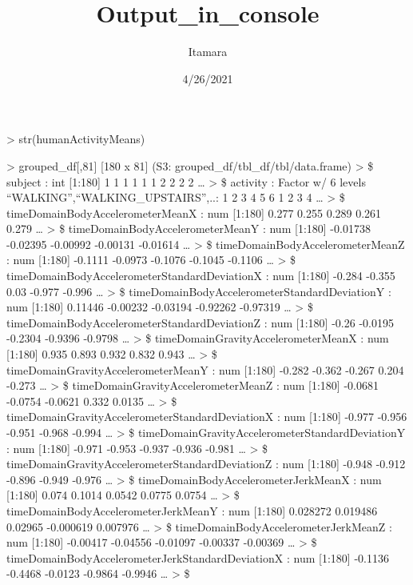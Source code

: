 \documentclass[
]{article}
\title{Output\_in\_console}
\author{Itamara}
\date{4/26/2021}
\begin{document}
\maketitle

{
\setcounter{tocdepth}{2}
\tableofcontents
}
\textgreater{} str(humanActivityMeans)

\textgreater{} grouped\_df{[},81{]} {[}180 x 81{]} (S3:
grouped\_df/tbl\_df/tbl/data.frame) \textgreater{} \$ subject : int
{[}1:180{]} 1 1 1 1 1 1 2 2 2 2 \ldots{} \textgreater{} \$ activity :
Factor w/ 6 levels ``WALKING'',``WALKING\_UPSTAIRS'',..: 1 2 3 4 5 6 1 2
3 4 \ldots{} \textgreater{} \$ timeDomainBodyAccelerometerMeanX : num
{[}1:180{]} 0.277 0.255 0.289 0.261 0.279 \ldots{} \textgreater{} \$
timeDomainBodyAccelerometerMeanY : num {[}1:180{]} -0.01738 -0.02395
-0.00992 -0.00131 -0.01614 \ldots{} \textgreater{} \$
timeDomainBodyAccelerometerMeanZ : num {[}1:180{]} -0.1111 -0.0973
-0.1076 -0.1045 -0.1106 \ldots{} \textgreater{} \$
timeDomainBodyAccelerometerStandardDeviationX : num {[}1:180{]} -0.284
-0.355 0.03 -0.977 -0.996 \ldots{} \textgreater{} \$
timeDomainBodyAccelerometerStandardDeviationY : num {[}1:180{]} 0.11446
-0.00232 -0.03194 -0.92262 -0.97319 \ldots{} \textgreater{} \$
timeDomainBodyAccelerometerStandardDeviationZ : num {[}1:180{]} -0.26
-0.0195 -0.2304 -0.9396 -0.9798 \ldots{} \textgreater{} \$
timeDomainGravityAccelerometerMeanX : num {[}1:180{]} 0.935 0.893 0.932
0.832 0.943 \ldots{} \textgreater{} \$
timeDomainGravityAccelerometerMeanY : num {[}1:180{]} -0.282 -0.362
-0.267 0.204 -0.273 \ldots{} \textgreater{} \$
timeDomainGravityAccelerometerMeanZ : num {[}1:180{]} -0.0681 -0.0754
-0.0621 0.332 0.0135 \ldots{} \textgreater{} \$
timeDomainGravityAccelerometerStandardDeviationX : num {[}1:180{]}
-0.977 -0.956 -0.951 -0.968 -0.994 \ldots{} \textgreater{} \$
timeDomainGravityAccelerometerStandardDeviationY : num {[}1:180{]}
-0.971 -0.953 -0.937 -0.936 -0.981 \ldots{} \textgreater{} \$
timeDomainGravityAccelerometerStandardDeviationZ : num {[}1:180{]}
-0.948 -0.912 -0.896 -0.949 -0.976 \ldots{} \textgreater{} \$
timeDomainBodyAccelerometerJerkMeanX : num {[}1:180{]} 0.074 0.1014
0.0542 0.0775 0.0754 \ldots{} \textgreater{} \$
timeDomainBodyAccelerometerJerkMeanY : num {[}1:180{]} 0.028272 0.019486
0.02965 -0.000619 0.007976 \ldots{} \textgreater{} \$
timeDomainBodyAccelerometerJerkMeanZ : num {[}1:180{]} -0.00417 -0.04556
-0.01097 -0.00337 -0.00369 \ldots{} \textgreater{} \$
timeDomainBodyAccelerometerJerkStandardDeviationX : num {[}1:180{]}
-0.1136 -0.4468 -0.0123 -0.9864 -0.9946 \ldots{} \textgreater{} \$
\end{document}
